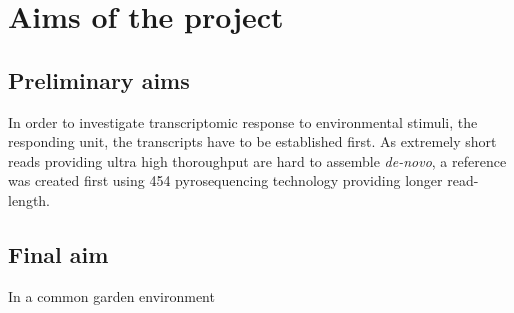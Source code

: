 
\chapter{Aims of the project} %


\section{Preliminary aims}

In order to investigate transcriptomic response to environmental
stimuli, the responding unit, the transcripts have to be established
first. As extremely short reads providing ultra high thoroughput are
hard to assemble \textit{de-novo}, a reference was created first using
454 pyrosequencing technology providing longer read-length.

\section{Final aim}

In a common garden environment 



     
